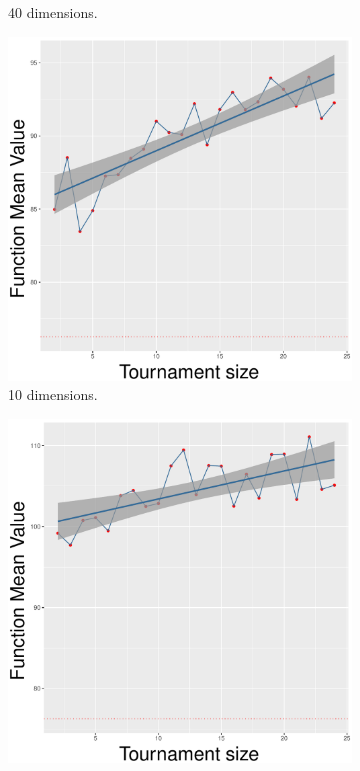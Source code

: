 \begin{figure}[!t]
\begin{subfigure}[b]{0.33\textwidth}
		\caption{40 dimensions.}
	\end{subfigure}
	\caption{Uniform crossover - ($\lambda, \lambda$) scheme.}
	\label{uniform-11-a}
	\begin{subfigure}[b]{0.33\textwidth}
		\centering
		\includegraphics[width=\textwidth]{img/2n2n-10D/unimodal_2n2n_11_dim_10.pdf}
		\caption{10 dimensions.}
	\end{subfigure}
	\begin{subfigure}[b]{0.33\textwidth}
		\centering
		\includegraphics[width=\textwidth]{img/2n2n-20D/unimodal_2n2n_11_dim_20.pdf}

\end{subfigure}
\end{figure}
